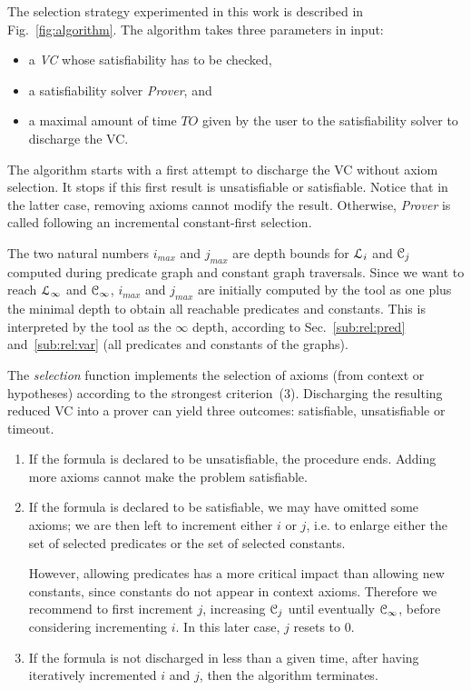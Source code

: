 \documentclass{acm_proc_article-sp}
\theoremstyle{nonumberplain}
\newcommand{\eV}{\EuScript C}
\newcommand{\TO}{TO}
\newcommand{\eL}{\EuScript L}
\begin{document}
The selection strategy experimented in this work is described in
Fig.~\ref{fig:algorithm}. The algorithm takes three parameters in
input:
\begin{itemize}
  \item a \textit{VC} whose satisfiability has to be checked, 
  \item a satisfiability solver \textit{Prover}, and
  \item a maximal amount of time $\TO$ given by the user to the
  satisfiability solver to discharge the VC.
\end{itemize}

The algorithm starts with a first attempt to discharge the VC 
without axiom selection. It stops if this first 
result is unsatisfiable or satisfiable. Notice that in the latter
case, removing axioms cannot modify the result.
Otherwise, \textit{Prover} is called following an incremental
constant-first selection.

The two natural numbers $i_{\textit{max}}$ and $j_{\textit{max}}$ are depth 
bounds for ${\eL}_{i}$ and ${\eV}_{j}$ computed during predicate graph
and constant graph traversals. Since we want to reach ${\eL}_{\infty}$ and $\eV_{\infty}$,  
$i_{\textit{max}}$ and $j_{\textit{max}}$ are initially computed by the tool as
one plus the minimal depth to obtain all reachable predicates and
constants. This is interpreted by the tool as the $\infty$ depth, according 
to Sec.~\ref{sub:rel:pred} and~\ref{sub:rel:var} (all predicates and
constants of the graphs).


The \textit{selection} function implements the selection of axioms (from
context or hypotheses) according to the strongest criterion~(3).
Discharging the resulting reduced VC into a prover
can yield three outcomes: satisfiable, unsatisfiable or timeout.


\begin{enumerate}
\item If the formula is declared to be unsatisfiable, the procedure
  ends. Adding more axioms cannot make the problem
  satisfiable. 
\vspace*{5pt}

\item If the formula is declared to be  satisfiable, we may have
omitted some axioms; we are then left to increment either $i$ or
$j$, i.e. to enlarge either the set of selected predicates 
or the set of selected constants.

However, allowing predicates has a more critical impact than allowing
new constants, since constants do not appear in context axioms.
Therefore we recommend to first increment $j$, increasing $\eV_j$ until
eventually $\eV_{\infty}$, before considering incrementing $i$. In this
later case, $j$ resets to $0$. 
\vspace*{5pt}

\item If the formula is not discharged in less than a given time,
  after having iteratively incremented $i$ and $j$, then the
  algorithm terminates.
\end{enumerate}
\end{document}

